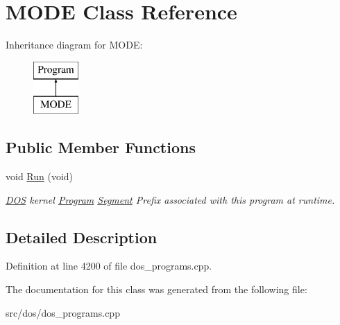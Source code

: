 \hypertarget{classMODE}{\section{M\-O\-D\-E Class Reference}
\label{classMODE}
}
Inheritance diagram for M\-O\-D\-E\-:\begin{figure}[H]
\begin{center}
\leavevmode
\includegraphics[height=2.000000cm]{classMODE}
\end{center}
\end{figure}
\subsection*{Public Member Functions}
\begin{DoxyCompactItemize}
\item 
\hypertarget{classMODE_ae1eafc4abaabb5f647bff778f0e78215}{void \hyperlink{classMODE_ae1eafc4abaabb5f647bff778f0e78215}{Run} (void)}\label{classMODE_ae1eafc4abaabb5f647bff778f0e78215}

\begin{DoxyCompactList}\small\item\em \hyperlink{classDOS}{D\-O\-S} kernel \hyperlink{classProgram}{Program} \hyperlink{structSegment}{Segment} Prefix associated with this program at runtime. \end{DoxyCompactList}\end{DoxyCompactItemize}


\subsection{Detailed Description}


Definition at line 4200 of file dos\-\_\-programs.\-cpp.



The documentation for this class was generated from the following file\-:\begin{DoxyCompactItemize}
\item 
src/dos/dos\-\_\-programs.\-cpp\end{DoxyCompactItemize}
